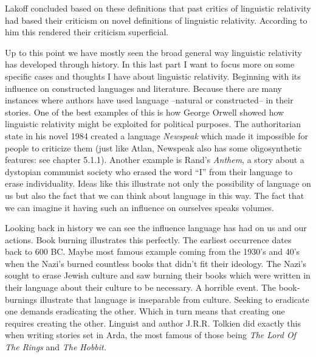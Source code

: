 \noindent Lakoff concluded based on these definitions that past critics of linguistic relativity had based their criticism on novel definitions of linguistic relativity. According to him this rendered their criticism superficial. 

 
	Up to this point we have mostly seen the broad general way linguistic relativity has developed through history. In this last part I want to focus more on some specific cases and thoughts I have about linguistic relativity. Beginning with its influence on constructed languages and literature. Because there are many instances where authors have used language --natural or constructed-- in their stories. One of the best examples of this is how George Orwell showed how linguistic relativity might be exploited for political purposes. The authoritarian state in his novel 1984 created a language {\it Newspeak} which made it impossible for people to criticize them (just like Atlan, Newspeak also has some oligosynthetic features: see chapter 5.1.1). Another example is Rand’s \textit{Anthem}, a story about a dystopian communist society who erased the word “I” from their language to erase individuality. Ideas like this illustrate not only the possibility of language on us but also the fact that we can think about language in this way. The fact that we can imagine it having such an influence on ourselves speaks volumes. 

  
	Looking back in history we can see the influence language has had on us and our actions. Book burning illustrates this perfectly. The earliest occurrence dates back to 600 BC. Maybe most famous example coming from the 1930’s and 40’s when the Nazi’s burned countless books that didn't fit their ideology. The Nazi’s sought to erase Jewish culture and saw burning their books which were written in their language about their culture to be necessary. A horrible event. The book-burnings illustrate that language is inseparable from culture. Seeking to eradicate one demands eradicating the other. Which in turn means that creating one requires creating the other. Linguist and author J.R.R. Tolkien did exactly this when writing stories set in Arda, the most famous of those being \textit{The Lord Of The Rings} and {\it The Hobbit.} 

